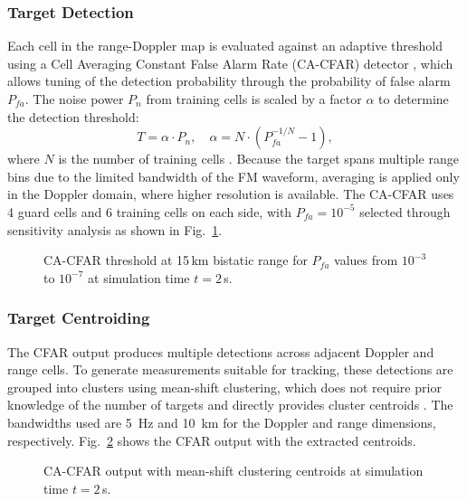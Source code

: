 \documentclass[conference]{IEEEtran}
\begin{document}
\subsubsection{Target Detection}

Each cell in the range-Doppler map is evaluated against an adaptive threshold using a Cell Averaging Constant False Alarm Rate (CA-CFAR) detector \cite{Shrivathsa2008a}, which allows tuning of the detection probability through the probability of false alarm $P_{fa}$. The noise power $P_n$ from training cells is scaled by a factor $\alpha$ to determine the detection threshold:
\begin{equation}
  T = \alpha \cdot P_n, \quad \alpha = N \cdot (P_{fa}^{-1/N} - 1),
\end{equation}
where $N$ is the number of training cells \cite{Sambath2020a}. Because the target spans multiple range bins due to the limited bandwidth of the FM waveform, averaging is applied only in the Doppler domain, where higher resolution is available. The CA-CFAR uses 4 guard cells and 6 training cells on each side, with $P_{fa} = 10^{-5}$ selected through sensitivity analysis as shown in Fig.~\ref{fig:cfarValidation}.

\begin{figure}[t]
  \centering
  
  \caption{CA-CFAR threshold at 15\,km bistatic range for $P_{fa}$ values from $10^{-3}$ to $10^{-7}$ at simulation time $t = 2$\,s.}
  \label{fig:cfarValidation}
\end{figure}

\subsubsection{Target Centroiding}
\label{subsec:centroiding}

The CFAR output produces multiple detections across adjacent Doppler and range cells. To generate measurements suitable for tracking, these detections are grouped into clusters using mean-shift clustering, which does not require prior knowledge of the number of targets and directly provides cluster centroids \cite{cheng1995mean, derpanis2005mean}. The bandwidths used are 5~Hz and 10~km for the Doppler and range dimensions, respectively. Fig.~\ref{fig:cfar_centroids} shows the CFAR output with the extracted centroids.

\begin{figure}[t]
  \centering
  
  \caption{CA-CFAR output with mean-shift clustering centroids at simulation time $t = 2$\,s.}
  \label{fig:cfar_centroids}
\end{figure}
\end{document}
